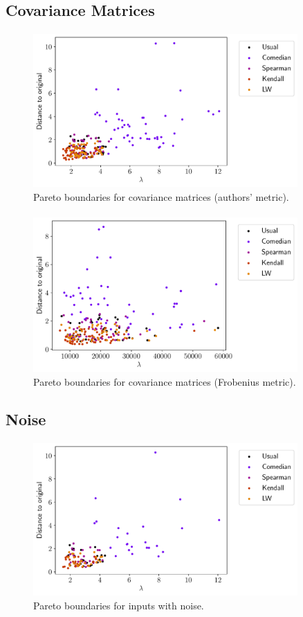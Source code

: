 \documentclass{beamer}
\theoremstyle{definition}
\theoremstyle{remark}
\theoremstyle{example}
\newif\ifinsection
\newif\ifinsubsection
\let\oldsubsection\subsection
\renewcommand{\subsection}{
  \global\insubsectiontrue
  \oldsubsection}
\newcommand {\aframe}[1] {
  \begin{frame}
    \ifinsection\frametitle{\secname}\fi
    \ifinsubsection\framesubtitle{\subsecname}\fi
  #1
  \end{frame}
}
\begin{document}
\subsection{Covariance Matrices}
\aframe{
  \begin{figure}
    \centering \includegraphics[width=0.9\textwidth]{figs/author-scatter.pdf}
    \caption{Pareto boundaries for covariance matrices (authors' metric).}
  \end{figure}
}

\aframe{
  \begin{figure}
    \centering \includegraphics[width=0.9\textwidth]{figs/fro-scatter.pdf}
    \caption{Pareto boundaries for covariance matrices (Frobenius metric).}
  \end{figure}
}

\subsection{Noise}
\aframe{
  \begin{figure}
    \centering \includegraphics[width=0.9\textwidth]{figs/noise-scatter.pdf}
    \caption{Pareto boundaries for inputs with noise.}
  \end{figure}
}
\end{document}
